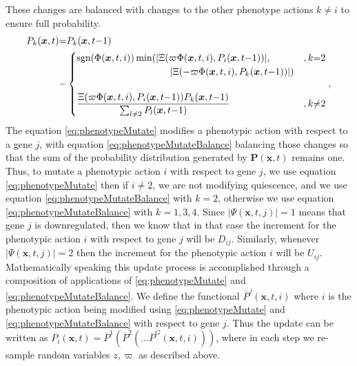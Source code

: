 \documentclass[\main/thesis.tex]{subfiles}
\begin{document}
These changes are balanced with changes to the other phenotype actions $k {\neq} i$ to ensure full probability. 
\begin{align}
P_k(\boldsymbol{x}, t) &{=} P_k(\boldsymbol{x}, t{-}1) \nonumber \\ &{-}
                           \begin{cases}
                              \text{sgn}(\Phi(\boldsymbol{x}, t, i))
                              \min(|\Xi(\varpi \Phi(\boldsymbol{x}, t, i), 
                                    P_i(\boldsymbol{x}, t{-}1))|,
                                & , k {=} 2 \\
                              \hspace{3.4cm} |\Xi({-}\varpi \Phi(\boldsymbol{x}, t, i),
                                              P_k(\boldsymbol{x}, t{-}1))|)
                             \\
                             \\
                             \displaystyle \frac{\Xi(\varpi \Phi(\boldsymbol{x}, t, i),
                             	                     P_i(\boldsymbol{x}, t{-}1))
                             	                 P_k(\boldsymbol{x}, t{-}1)}
                                                {\sum_{l{\ne}2} P_l(\boldsymbol{x}, t{-}1)}
                               & , k {\ne} 2
                            \end{cases}, 
\label{eq:phenotypeMutateBalance}
\end{align}
The equation \eqref{eq:phenotypeMutate} modifies a phenotypic action with 
respect to a gene $j$, with equation \eqref{eq:phenotypeMutateBalance} balancing those changes so that the sum of the probability distribution generated by $\boldsymbol{P}(\boldsymbol{x}, t)$ remains one. Thus, to mutate a phenotypic action $i$ with respect to gene $j$, we use equation \eqref{eq:phenotypeMutate} then if $i {\ne} 2$, we are not modifying quiescence, and we use equation \eqref{eq:phenotypeMutateBalance} with $k {=} 2$, otherwise we use equation \eqref{eq:phenotypeMutateBalance} with $k {=} 1, 3, 4$. 
Since $|\Psi(\boldsymbol{x}, t, j)| {=} 1$ means that gene $j$ is downregulated, then we know that in that case the increment for the phenotypic action $i$ with respect to gene $j$ will be $D_{ij}$. 
Similarly, whenever $|\Psi(\boldsymbol{x}, t, j)| {=} 2$ then the increment for the phenotypic action $i$ will be $U_{ij}$. Mathematically speaking this update process is
accomplished through a composition of applications of \eqref{eq:phenotypeMutate} and 
\eqref{eq:phenotypeMutateBalance}.
We define the functional $\overline{P}^j(\boldsymbol{x}, t, i)$ where $i$ is the 
phenotypic action being modified using \eqref{eq:phenotypeMutate} and 
\eqref{eq:phenotypeMutateBalance} with respect to gene $j$. Thus the update can be written as 
$P_i(\boldsymbol{x}, t) = \overline{P}^1(\overline{P}^2(...\overline{P}^G(\boldsymbol{x}, t, i)))$, where in each step we re-sample random variables $z,\varpi$ as described above. 
\end{document}
